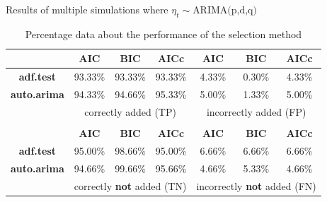 \documentclass[10pt]{beamer}
\begin{document}
\begin{frame}{Results of multiple simulations where $\eta_t\sim\text{ARIMA(p,d,q)}$}
    \begin{table}
        \centering\small 
        \renewcommand{\arraystretch}{1.3}
        \setlength{\tabcolsep}{10pt}
        \label{simulations2}
        \caption{Percentage data about the performance of the selection method}
        \begin{tabular}{|c|ccc|ccc|}
            \cline{2-7}
            \multicolumn{1}{c|}{}   & \textbf{AIC}  & \textbf{BIC}  & \textbf{AICc}            & \textbf{AIC}      & \textbf{BIC}   & \textbf{AICc} \\
            \hline       
            \textbf{adf.test}       & 93.33\%       & 93.33\%        & 93.33\%                 & 4.33\%            & 0.30\%         & 4.33\%        \\
            \textbf{auto.arima}     & 94.33\%       & 94.66\%        & 95.33\%                 & 5.00\%            & 1.33\%         & 5.00\%        \\
            \hline
            \multicolumn{1}{|c|}{}   & \multicolumn{3}{c|}{correctly added (TP)}               & \multicolumn{3}{c|}{incorrectly added (FP)}         \\
            \hline 
            \multicolumn{7}{c}{}                                                                                                                    \\
            \cline{2-7}
            \multicolumn{1}{c|}{}   & \textbf{AIC}  & \textbf{BIC}  & \textbf{AICc}           & \textbf{AIC}      & \textbf{BIC}   & \textbf{AICc}  \\ 
            \hline        
            \textbf{adf.test}       & 95.00\%       & 98.66\%        & 95.00\%                & 6.66\%            & 6.66\%         & 6.66\%         \\
            \textbf{auto.arima}     & 94.66\%       & 99.66\%        & 95.66\%                & 4.66\%            & 5.33\%         & 4.66\%         \\
            \hline 
            \multicolumn{1}{|c|}{}   & \multicolumn{3}{c|}{correctly \textbf{not} added (TN)} & \multicolumn{3}{c|}{incorrectly \textbf{not} added (FN)}  \\
            \hline
        \end{tabular}
    \end{table}
\end{frame}
\end{document}
